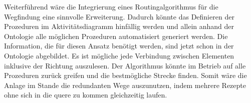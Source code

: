 Weiterführend wäre die Integrierung eines Routingalgorithmus für die Wegfindung eine sinnvolle Erweiterung. Dadurch könnte das Definieren der Prozeduren im Aktivitätsdiagramm hinfällig werden und allein anhand der Ontologie alle möglichen Prozeduren automatisiert generiert werden. Die Information, die für diesen Ansatz benötigt werden, sind jetzt schon in der Ontologie abgebildet. Es ist mögliche jede Verbindung zwischen Elementen inklusive der Richtung auszulesen. Der Algorithmus könnte im Betrieb auf alle Prozeduren zurück greifen und die bestmögliche Strecke finden.
Somit wäre die Anlage im Stande die redundanten Wege auszunutzen, indem mehrere Rezepte ohne sich in die quere zu kommen gleichzeitig laufen.

